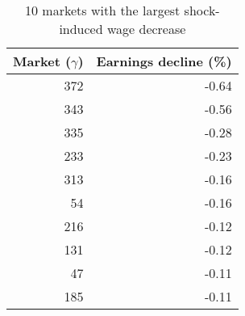 \begin{table}
\centering
\caption{10 markets with the largest shock-induced wage decrease}
\begin{tabular}{rr}
\toprule
 Market ($\gamma$) &  Earnings decline (\%) \\
\midrule
               372 &                  -0.64 \\
               343 &                  -0.56 \\
               335 &                  -0.28 \\
               233 &                  -0.23 \\
               313 &                  -0.16 \\
                54 &                  -0.16 \\
               216 &                  -0.12 \\
               131 &                  -0.12 \\
                47 &                  -0.11 \\
               185 &                  -0.11 \\
\bottomrule
\end{tabular}
\end{table}
